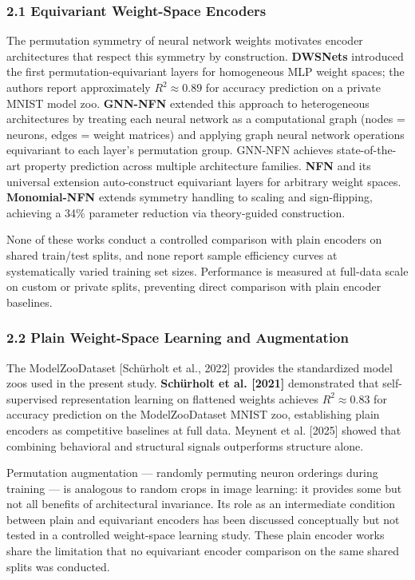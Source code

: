 
\subsubsection{2.1 Equivariant Weight-Space Encoders}

The permutation symmetry of neural network weights motivates encoder architectures that respect this symmetry by construction. \textbf{DWSNets} \citep{Navon2023Equivariant} introduced the first permutation-equivariant layers for homogeneous MLP weight spaces; the authors report approximately $R^{2}\approx 0.89$ for accuracy prediction on a private MNIST model zoo. \textbf{GNN-NFN} \citep{Kofinas2024Graph} extended this approach to heterogeneous architectures by treating each neural network as a computational graph (nodes = neurons, edges = weight matrices) and applying graph neural network operations equivariant to each layer's permutation group. GNN-NFN achieves state-of-the-art property prediction across multiple architecture families. \textbf{NFN} \citep{Zhou2023Permutation} and its universal extension \citep{Zhou2024Universal} auto-construct equivariant layers for arbitrary weight spaces. \textbf{Monomial-NFN} \citep{Tran2024Monomial} extends symmetry handling to scaling and sign-flipping, achieving a 34\% parameter reduction via theory-guided construction.

None of these works conduct a controlled comparison with plain encoders on shared train/test splits, and none report sample efficiency curves at systematically varied training set sizes. Performance is measured at full-data scale on custom or private splits, preventing direct comparison with plain encoder baselines.

\subsubsection{2.2 Plain Weight-Space Learning and Augmentation}

The ModelZooDataset [Schürholt et al., 2022] provides the standardized model zoos used in the present study. \textbf{Schürholt et al. [2021]} demonstrated that self-supervised representation learning on flattened weights achieves $R^{2}\approx 0.83$ for accuracy prediction on the ModelZooDataset MNIST zoo, establishing plain encoders as competitive baselines at full data. Meynent et al. [2025] showed that combining behavioral and structural signals outperforms structure alone.

Permutation augmentation --- randomly permuting neuron orderings during training --- is analogous to random crops in image learning: it provides some but not all benefits of architectural invariance. Its role as an intermediate condition between plain and equivariant encoders has been discussed conceptually but not tested in a controlled weight-space learning study. These plain encoder works share the limitation that no equivariant encoder comparison on the same shared splits was conducted.

